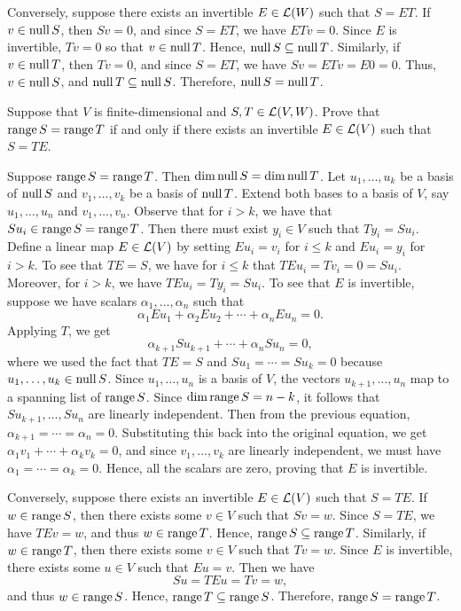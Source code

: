 \begin{exc}
\begin{solution}
Conversely, suppose there exists an invertible $E\in\mathcal{L}(W)$ such that $S=ET$.
If $v\in\operatorname{null} S$, then $Sv=0$, and since $S=ET$, we have $ETv=0$. Since $E$ is
invertible, $Tv=0$ so that $v\in\operatorname{null} T$. Hence, $\operatorname{null} S\subseteq\operatorname{null} T$.
Similarly, if $v\in\operatorname{null} T$, then $Tv=0$, and since $S=ET$, we have
$Sv=ETv=E0=0$. Thus, $v\in\operatorname{null} S$, and $\operatorname{null} T\subseteq\operatorname{null} S$. Therefore,
$\operatorname{null} S=\operatorname{null} T$.
\end{solution}

\begin{exercise}
Suppose that $V$ is finite-dimensional and $S,T\in\mathcal{L}(V,W)$. Prove that
$\operatorname{range} S=\operatorname{range} T$ if and only if there exists an invertible $E\in\mathcal{L}(V)$ such
that $S=TE$.
\end{exercise}
\begin{solution}
Suppose $\operatorname{range} S=\operatorname{range} T$. Then $\operatorname{dim}\operatorname{null} S=\operatorname{dim}\operatorname{null} T$. Let $u_1,\dots,u_k$
be a basis of $\operatorname{null} S$ and $v_1,\dots,v_k$ be a basis of $\operatorname{null} T$. Extend both
bases to a basis of $V$, say $u_1,\dots,u_n$ and $v_1,\dots,v_n$. Observe that
for $i>k$, we have that $Su_i\in\operatorname{range} S=\operatorname{range} T$. Then there must exist
$y_i\in V$ such that $Ty_i=Su_i$. Define a linear map $E\in\mathcal{L}(V)$ by setting
$Eu_i=v_i$ for $i\le k$ and $Eu_i=y_i$ for $i>k$. To see that $TE=S$, we have
for $i\le k$ that $TEu_i=Tv_i=0=Su_i$. Moreover, for $i>k$, we have
$TEu_i=Ty_i=Su_i$. To see that $E$ is invertible, suppose we have scalars
$\alpha_1,\dots,\alpha_n$ such that
\[ \alpha_1Eu_1+\alpha_2Eu_2+\cdots+\alpha_nEu_n = 0. \]
Applying $T$, we get
\[ \alpha_{k+1}Su_{k+1}+\cdots+\alpha_nSu_n = 0, \]
where we used the fact that $TE=S$ and $Su_1=\cdots=Su_k=0$ because
$u_1,\dots,u_k\in\operatorname{null} S$. Since $u_1,\dots,u_n$ is a basis of $V$, the vectors
$u_{k+1},\dots,u_n$ map to a spanning list of $\operatorname{range} S$. Since
$\operatorname{dim}\operatorname{range} S=n-k$, it follows that $Su_{k+1},\dots,Su_n$ are linearly
independent. Then from the previous equation, $\alpha_{k+1}=\cdots=\alpha_n=0$.
Substituting this back into the original equation, we get
$\alpha_1v_1+\cdots+\alpha_kv_k=0$, and since $v_1,\dots,v_k$ are linearly
independent, we must have $\alpha_1=\cdots=\alpha_k=0$. Hence, all the scalars
are zero, proving that $E$ is invertible.

Conversely, suppose there exists an invertible $E\in\mathcal{L}(V)$ such that $S=TE$.
If $w\in\operatorname{range} S$, then there exists some $v\in V$ such that $Sv=w$. Since
$S=TE$, we have $TEv=w$, and thus $w\in\operatorname{range} T$. Hence,
$\operatorname{range} S\subseteq\operatorname{range} T$. Similarly, if $w\in\operatorname{range} T$, then there exists
some $v\in V$ such that $Tv=w$. Since $E$ is invertible, there exists some
$u\in V$ such that $Eu=v$. Then we have
\[ Su = TEu = Tv = w, \]
and thus $w\in\operatorname{range} S$. Hence, $\operatorname{range} T\subseteq\operatorname{range} S$. Therefore,
$\operatorname{range} S=\operatorname{range} T$.
\end{solution}


\end{exc}
